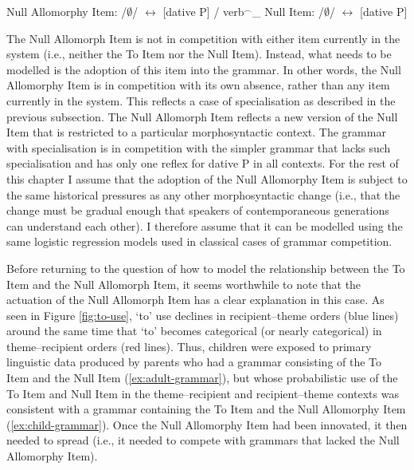 	\begin{exe}
		\ex \label{ex:all-null} 
			\begin{xlist}
				\ex Null Allomorphy Item: /$\emptyset$/ $\leftrightarrow$ [dative P] / verb$^{\smallfrown}$\_
				\ex Null Item:  /$\emptyset$/ $\leftrightarrow$ [dative P]
			\end{xlist}
	\end{exe}

	The Null Allomorph Item is not in competition with either item currently in the system (i.e., neither the To Item nor the Null Item). Instead, what needs to be modelled is the adoption of this item into the grammar. In other words, the Null Allomorphy Item is in competition with its own absence, rather than any item currently in the system. This reflects a case of specialisation as described in the previous subsection. The Null Allomorph Item reflects a new version of the Null Item that is restricted to a particular morphosyntactic context. The grammar with specialisation is in competition with the simpler grammar that lacks such specialisation and has only one reflex for dative P in all contexts. For the rest of this chapter I assume that the adoption of the Null Allomorphy Item is subject to the same historical pressures as any other morphosyntactic change (i.e., that the change must be gradual enough that speakers of contemporaneous generations can understand each other). I therefore assume that it can be modelled using the same logistic regression models used in classical cases of grammar competition.

	Before returning to the question of how to model the relationship between the To Item and the Null Allomorph Item, it seems worthwhile to note that the actuation of the Null Allomorph Item has a clear explanation in this case. As seen in Figure \ref{fig:to-use}, `to' use declines in recipient--theme orders (blue lines) around the same time that `to' becomes categorical (or nearly categorical) in theme--recipient orders (red lines). Thus, children were exposed to primary linguistic data produced by parents who had a grammar consisting of the To Item and the Null Item (\ref{ex:adult-grammar}), but whose probabilistic use of the To Item and Null Item in the theme--recipient and recipient--theme contexts was consistent with a grammar containing the To Item and the Null Allomorphy Item (\ref{ex:child-grammar}). Once the Null Allomorphy Item had been innovated, it then needed to spread (i.e., it needed to compete with grammars that lacked the Null Allomorphy Item).

